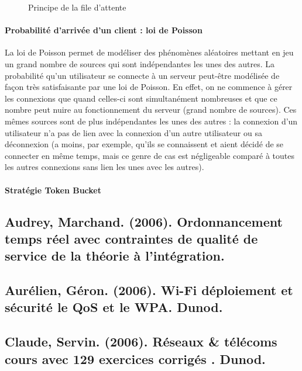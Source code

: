 \documentclass[french]{article}
\begin{document}
\begin{figure}[h]
	\caption{Principe de la file d'attente}
	\label{fig:file_attente}
\end{figure} 


\paragraph{Probabilité d'arrivée d'un client : loi de Poisson}

La loi de Poisson permet de modéliser des phénomènes aléatoires mettant en jeu un grand nombre de sources qui sont indépendantes les unes des autres.
La probabilité qu'un utilisateur se connecte à un serveur peut-être modélisée de façon très satisfaisante par une loi de Poisson. En effet, on ne commence à gérer les connexions que quand celles-ci sont simultanément nombreuses et que ce nombre peut nuire au fonctionnement du serveur (grand nombre de sources). Ces mêmes sources sont de plus indépendantes les unes des autres : la connexion d'un utilisateur n'a pas de lien avec la connexion d'un autre utilisateur ou sa déconnexion (a moins, par exemple, qu'ils se connaissent et aient décidé de se connecter en même temps, mais ce genre de cas est négligeable comparé à toutes les autres connexions sans lien les unes avec les autres).

\paragraph{Stratégie Token Bucket}


\subsection*{Audrey, Marchand. (2006). Ordonnancement temps réel avec contraintes de qualité de service de la théorie à l'intégration.}

\subsection*{Aurélien, Géron. (2006). Wi-Fi déploiement et sécurité le QoS et le WPA. Dunod.}

\subsection*{Claude, Servin. (2006). Réseaux \& télécoms cours avec 129 exercices corrigés . Dunod.}
\end{document}
